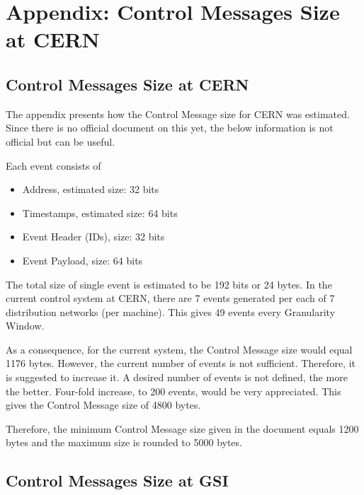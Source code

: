 \chapter{Appendix: Control Messages Size at CERN}
\label{appB}

\section{Control Messages Size at CERN}
The appendix presents how the Control Message size for CERN was estimated.
Since there is no official document on this yet, the below information is not
official but can be useful.

Each event consists of
\begin{itemize}
  \item Address, estimated size: 32 bits
  \item Timestamps, estimated size: 64 bits
  \item Event Header (IDs), size: 32 bits
  \item Event Payload, size: 64 bits
\end{itemize}

The total size of single event is estimated to be 192 bits or 24 bytes.
In the current control system at CERN, there are 7 events generated per each of
7 distribution networks (per machine). This gives 49 events every Granularity
Window. 

As a consequence, for the current system, the Control Message size would equal
1176 bytes. However, the current number of events is not sufficient. Therefore,
it is suggested to increase it. A desired number of events is not defined, the
more the better. Four-fold increase, to 200 events, would be very appreciated.
This gives the Control Message size of 4800 bytes. 

Therefore, the minimum Control Message size given in the document equals 1200
bytes and the maximum size is rounded to 5000 bytes. 


\section{Control Messages Size at GSI}

